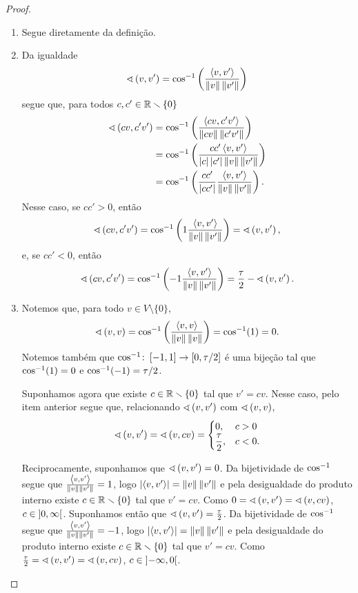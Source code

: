 \begin{proof}
	\begin{enumerate}
	\item Segue diretamente da definição.
	\item Da igualdade
	\begin{equation*}
	\ang{v}{v'} = \cos\inv\left(\frac{\inte{v}{v'}}{\nor{v}\nor{v'}}\right)
	\end{equation*}
segue que, para todos $c,c' \in \R\setminus\{0\}$
	\begin{align*}
	\ang{cv}{c'v'} &= \cos\inv\left(\frac{\inte{cv}{c'v'}}{\nor{cv}\nor{c'v'}}\right) \\
		&= \cos\inv\left(\frac{cc'\inte{v}{v'}}{\abs{c}\abs{c'}\nor{v}\nor{v'}}\right) \\
		&= \cos\inv\left(\frac{cc'}{\abs{cc'}}\frac{\inte{v}{v'}}{\nor{v}\nor{v'}}\right).
	\end{align*}
Nesse caso, se $cc' > 0$, então
	\begin{equation*}
	\ang{cv}{c'v'} = \cos\inv\left(1\frac{\inte{v}{v'}}{\nor{v}\nor{v'}}\right) = \ang{v}{v'},
	\end{equation*}
e, se $cc' < 0$, então
	\begin{equation*}
	\ang{cv}{c'v'} = \cos\inv\left(-1\frac{\inte{v}{v'}}{\nor{v}\nor{v'}}\right) = \frac{\tau}{2} - \ang{v}{v'}.
	\end{equation*}

	\item Notemos que, para todo $v \in V \setminus \{0\}$,
		\begin{equation*}
			\ang{v}{v} = \cos\inv\left(\frac{\inte{v}{v}}{\nor{v}\nor{v}}\right) = \cos\inv(1) = 0.
		\end{equation*}
Notemos também que $\cos\inv\colon \intff{-1}{1} \to \intff{0}{\tau/2}$ é uma bijeção tal que $\cos\inv(1)=0$ e $\cos\inv(-1) = \tau/2$.

Suponhamos agora que existe $c \in \R \setminus \{0\}$ tal que $v'=cv$. Nesse caso, pelo item anterior segue que, relacionando $\ang{v}{v'}$ com $\ang{v}{v}$,
		\begin{equation*}
		\ang{v}{v'} = \ang{v}{cv} = \begin{cases}
		0,& c>0 \\
		\displaystyle\frac{\tau}{2},& c<0.
	\end{cases}
		\end{equation*}

Reciprocamente, suponhamos que $\ang{v}{v'}=0$. Da bijetividade de $\cos\inv$ segue que $\frac{\inte{v}{v'}}{\nor{v}\nor{v'}} = 1$, logo $\abs{\inte{v}{v'}} = \nor{v}\nor{v'}$ e pela desigualdade do produto interno existe $c \in \R \setminus \{0\}$ tal que $v'=cv$. Como $0 = \ang{v}{v'} = \ang{v}{cv}$, $c \in \intaa{0}{\infty}$. Suponhamos então que $\ang{v}{v'}=\frac{\tau}{2}$. Da bijetividade de $\cos\inv$ segue que $\frac{\inte{v}{v'}}{\nor{v}\nor{v'}} = -1$, logo $\abs{\inte{v}{v'}} = \nor{v}\nor{v'}$ e pela desigualdade do produto interno existe $c \in \R \setminus \{0\}$ tal que $v'=cv$. Como $\frac{\tau}{2} = \ang{v}{v'} = \ang{v}{cv}$, $c \in \intaa{-\infty}{0}$.


\end{enumerate}
\end{proof}
